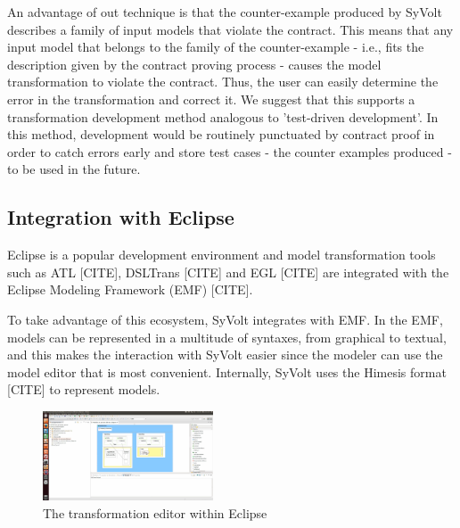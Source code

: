 An advantage of out technique is that the counter-example produced by SyVolt
describes a family of input models that violate the contract. This means that
any input model that belongs to the family of the counter-example - i.e., fits
the description given by the contract proving process - causes the model
transformation to violate the contract.  Thus, the user can easily determine the error in the
transformation and correct it. We suggest that this supports a transformation
development method analogous to 'test-driven development'. In this method,
development would be routinely punctuated by contract proof in order to catch
errors early and store test cases - the counter examples produced - to be used
in the future.


\subsection{Integration with Eclipse}

Eclipse is a popular development environment and model transformation
tools such as ATL [CITE], DSLTrans [CITE] and EGL [CITE] are integrated with the
Eclipse Modeling Framework (EMF) [CITE].

To take advantage of this ecosystem, SyVolt integrates with EMF.
In the EMF, models can be represented in a multitude of syntaxes, from graphical
to textual, and this makes the interaction with SyVolt easier since the modeler
can use the model editor that is most convenient. Internally, SyVolt uses 
the Himesis format [CITE] to represent models.



\begin{figure}
\centering
\includegraphics[width=0.45\textwidth]{figures/eclipse_frontend}
\caption{The transformation editor within Eclipse}
\label{fig:eclipse_frontend}
\end{figure}




 